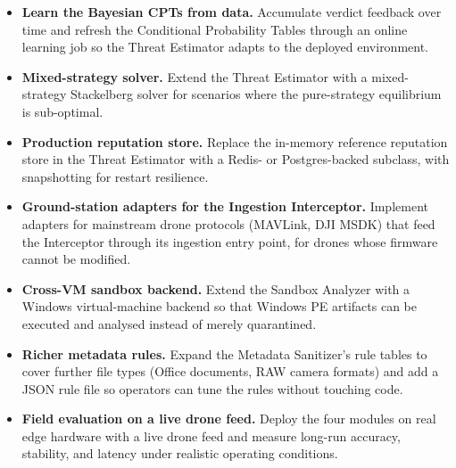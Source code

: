 \documentclass[12pt, a4paper]{report}
\begin{document}
\begin{itemize}
    \item \textbf{Learn the Bayesian CPTs from data.} Accumulate
          verdict feedback over time and refresh the Conditional
          Probability Tables through an online learning job so the
          Threat Estimator adapts to the deployed environment.
    \item \textbf{Mixed-strategy solver.} Extend the Threat Estimator
          with a mixed-strategy Stackelberg solver for scenarios where
          the pure-strategy equilibrium is sub-optimal.
    \item \textbf{Production reputation store.} Replace the in-memory
          reference reputation store in the Threat Estimator with a
          Redis- or Postgres-backed subclass, with snapshotting for
          restart resilience.
    \item \textbf{Ground-station adapters for the Ingestion
          Interceptor.} Implement adapters for mainstream drone
          protocols (MAVLink, DJI MSDK) that feed the Interceptor
          through its ingestion entry point, for drones whose
          firmware cannot be modified.
    \item \textbf{Cross-VM sandbox backend.} Extend the Sandbox
          Analyzer with a Windows virtual-machine backend so that
          Windows PE artifacts can be executed and analysed instead
          of merely quarantined.
    \item \textbf{Richer metadata rules.} Expand the Metadata
          Sanitizer's rule tables to cover further file types
          (Office documents, RAW camera formats) and add a JSON rule
          file so operators can tune the rules without touching code.
    \item \textbf{Field evaluation on a live drone feed.} Deploy the
          four modules on real edge hardware with a live drone feed
          and measure long-run accuracy, stability, and latency under
          realistic operating conditions.
\end{itemize}

\cleardoublepage




\nocite{*}


\end{document}
